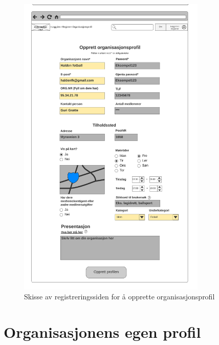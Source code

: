 \begin{figure}[H]
\centering
\includegraphics[width=0.8\textwidth]{Illustrasjoner/Skisser/2.0/2-8-opprett-org-profil.png}
\caption{Skisse av registreringssiden for å opprette organisasjonsprofil}
\label{vedlegg:2-8-reg-org}
\end{figure}

\section{Organisasjonens egen profil}

